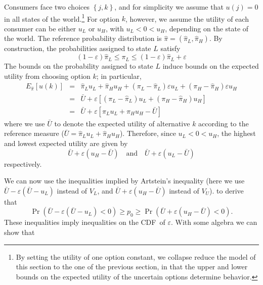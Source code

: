 \documentclass{article}
\begin{document}
Consumers face two choices $\left\{ j,k\right\} $, and for simplicity we
assume that $u\left( j\right) =0$ in all states of the world.\footnote{%
By setting the utility of one option constant, we collapse reduce the model
of this section to the one of the previous section, in that the upper and
lower bounds on the expected utility of the uncertain options determine
behavior.} For option $k$, however, we assume the utility of each consumer
can be either $u_{L}$ or $u_{H}$, with $u_{L}<0<u_{H}$, depending on the
state of the world. The reference probability distribution is $\hat{\pi}%
=\left( \hat{\pi}_{L},\hat{\pi}_{H}\right) $. By construction, the
probabilities assigned to state $L$ satisfy%
\begin{equation*}
\left( 1-\varepsilon \right) \hat{\pi}_{L}\leq \pi _{L}\leq \left(
1-\varepsilon \right) \hat{\pi}_{L}+\varepsilon
\end{equation*}%
The bounds on the probability assigned to state $L$ induce bounds on the
expected utility from choosing option $k$; in particular,%
\begin{eqnarray*}
E_{\hat{\pi}}\left[ u\left( k\right) \right] &=&\hat{\pi}_{L}u_{L}+\hat{\pi}%
_{H}u_{H}+\left( \pi _{L}-\hat{\pi}_{L}\right) \varepsilon u_{L}+\left( \pi
_{H}-\hat{\pi}_{H}\right) \varepsilon u_{H} \\
&=&\bar{U}+\varepsilon \left[ \left( \pi _{L}-\hat{\pi}_{L}\right)
u_{L}+\left( \pi _{H}-\hat{\pi}_{H}\right) u_{H}\right] \\
&=&\bar{U}+\varepsilon \left[ \pi _{L}u_{L}+\pi _{H}u_{H}-\bar{U}\right]
\end{eqnarray*}%
where we use $\bar{U}$ to denote the expected utility of alternative $k$
according to the reference measure ($\bar{U}=\hat{\pi}_{L}u_{L}+\hat{\pi}%
_{H}u_{H}$). Therefore, since $u_{L}<0<u_{H}$, the highest and lowest
expected utility are given by%
\begin{equation*}
\bar{U}+\varepsilon \left( u_{H}-\bar{U}\right) \quad \text{and}\quad \bar{U}%
+\varepsilon \left( u_{L}-\bar{U}\right)
\end{equation*}%
respectively.

We can now use the inequalities implied by Artstein's inequality (here we
use $\bar{U}-\varepsilon \left( \bar{U}-u_{L}\right) $ instead of $V_{L}$,
and $\bar{U}+\varepsilon \left( u_{H}-\bar{U}\right) $ instead of $V_{U}$).
to derive that 
\begin{equation*}
\Pr \left( \bar{U}-\varepsilon \left( \bar{U}-u_{L}\right) <0\right) \geq
p_{0}\geq \Pr \left( \bar{U}+\varepsilon \left( u_{H}-\bar{U}\right)
<0\right) .
\end{equation*}%
These inequalities imply inequalities on the CDF\ of $\varepsilon $. With
some algebra we can show that
\end{document}
